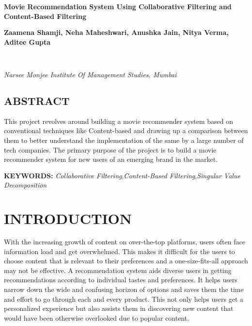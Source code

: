 \documentclass[a4paper,10pt]{article}
\begin{document}
\noindent 
\begin{center}
\textbf{{\Large Movie Recommendation System Using Collaborative Filtering and Content-Based Filtering}} \\
\end{center}

\noindent 
\begin{center}
\textbf{ Zaamena Shamji, Neha Maheshwari, Anushka Jain, Nitya Verma, Aditee Gupta } 
\end{center}\\[-0.5cm]

\begin{center}
\textit{Narsee Monjee Institute Of Management Studies, Mumbai}\\
\end{center}


\noindent 
\begin{center}
    \subsection*{ABSTRACT}
    This project revolves around building a movie recommender system based on conventional techniques like Content-based and drawing up a comparison between them to better understand the implementation of the same by a large number of tech companies. The primary purpose of the project is to build a movie recommender system for new users of an emerging brand in the market.

\end{center}

\noindent 
\textbf{KEYWORDS:} \textit{Collaborative Filtering},\textit{Content-Based Filtering},\textit{Singular Value Decomposition}


\section{INTRODUCTION}
With the increasing growth of content on over-the-top platforms, users often face information load and get overwhelmed. This makes it difficult for the users to choose content that is relevant to their preferences and a one-size-fits-all approach may not be effective. A recommendation system aids diverse users in getting recommendations according to individual tastes and preferences. It helps users narrow down the wide and confusing horizon of options and saves them the time and effort to go through each and every product. This not only helps users get a personalized experience but also assists them in discovering new content that would have been otherwise overlooked due to popular content.
\end{document}

